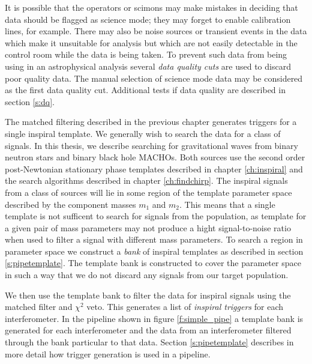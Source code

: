 It is possible that the operators or scimons may make mistakes in deciding
that data should be flagged as science mode; they may forget to enable
calibration lines, for example. There may also be noise sources or transient
events in the data which make it unsuitable for analysis but which are not
easily detectable in the control room while the data is being taken. To
prevent such data from being using in an astrophysical analysis several
\emph{data quality cuts} are used to discard poor quality data. The manual
selection of science mode data may be considered as the first data quality
cut.  Additional tests if data quality are described in section \ref{s:dq}.

The matched filtering described in the previous chapter generates triggers for
a single inspiral template. We generally wish to search the data for a class
of signals. In this thesis, we describe searching for gravitational waves from
binary neutron stars and binary black hole MACHOs.  Both sources use the
second order post-Newtonian stationary phase templates described in chapter
\ref{ch:inspiral} and the search algorithms described in chapter
\ref{ch:findchirp}. The inspiral signals from a class of sources will lie in
some region of the template parameter space described by the component masses
$m_1$ and $m_2$. This means that a single template is not sufficent to search
for signals from the population, as template for a given pair of mass
parameters may not produce a hight signal-to-noise ratio when used to filter a
signal with different mass parameters. To search a region in parameter space
we construct a \emph{bank} of inspiral templates as described in section
\ref{s:pipetemplate}. The template bank is constructed to cover the parameter
space in such a way that we do not discard any signals from our target
population.

We then use the template bank to filter the data for inspiral signals using
the matched filter and $\chi^2$ veto. This generates a list of \emph{inspiral
triggers} for each interferometer. In the pipeline shown in figure
\ref{f:simple_pipe} a template bank is generated for each interferometer and
the data from an interferometer filtered through the bank particular to that
data. Section \ref{s:pipetemplate} describes in more detail how trigger
generation is used in a pipeline.


